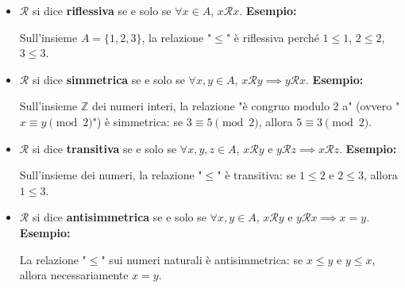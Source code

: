 \documentclass[oneside,10pt]{book} %
\begin{document}
\begin{itemize}
    \item $\mathcal{R}$ si dice \textbf{riflessiva} se e solo se $\forall x \in A$, $x \mathcal{R} x$.
    \textbf{Esempio:}
    \begin{tcolorbox}[colback=gray!10, arc=0mm, boxrule=0.5pt, left=2mm, right=2mm, top=1mm, bottom=1mm]
      Sull'insieme $A = \{1, 2, 3\}$, la relazione "$\leq$" è riflessiva perché $1 \leq 1$, $2 \leq 2$, $3 \leq 3$.
    \end{tcolorbox}

    \item $\mathcal{R}$ si dice \textbf{simmetrica} se e solo se $\forall x, y \in A$, $x \mathcal{R} y \implies y \mathcal{R} x$.
    \textbf{Esempio:}
    \begin{tcolorbox}[colback=gray!10, arc=0mm, boxrule=0.5pt, left=2mm, right=2mm, top=1mm, bottom=1mm]
      Sull'insieme $\mathbb{Z}$ dei numeri interi, la relazione "è congruo modulo 2 a" (ovvero "$x \equiv y \pmod{2}$") è simmetrica: se $3 \equiv 5 \pmod{2}$, allora $5 \equiv 3 \pmod{2}$.
    \end{tcolorbox}

    \item $\mathcal{R}$ si dice \textbf{transitiva} se e solo se $\forall x, y, z \in A$, $x \mathcal{R} y$ e $y \mathcal{R} z \implies x \mathcal{R} z$.
    \textbf{Esempio:}
    \begin{tcolorbox}[colback=gray!10, arc=0mm, boxrule=0.5pt, left=2mm, right=2mm, top=1mm, bottom=1mm]
      Sull'insieme dei numeri, la relazione "$\leq$" è transitiva: se $1 \leq 2$ e $2 \leq 3$, allora $1 \leq 3$.
    \end{tcolorbox}

    \item $\mathcal{R}$ si dice \textbf{antisimmetrica} se e solo se $\forall x, y \in A$, $x \mathcal{R} y$ e $y \mathcal{R} x \implies x = y$.
    \textbf{Esempio:}
    \begin{tcolorbox}[colback=gray!10, arc=0mm, boxrule=0.5pt, left=2mm, right=2mm, top=1mm, bottom=1mm]
      La relazione "$\leq$" sui numeri naturali è antisimmetrica: se $x \leq y$ e $y \leq x$, allora necessariamente $x = y$.
    \end{tcolorbox}
\end{itemize}

\end{document}
